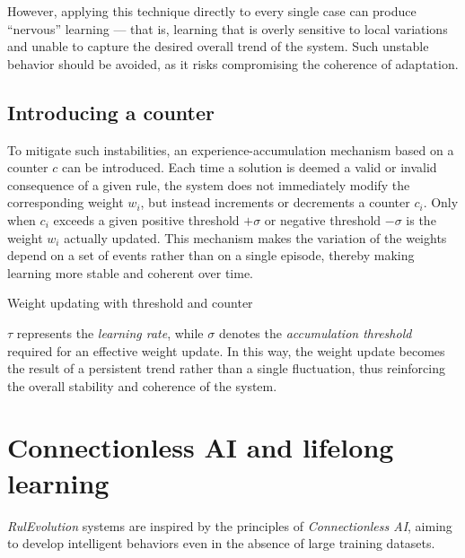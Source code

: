 \documentclass[12pt,a4paper]{article}
\begin{document}
However, applying this technique directly to every single case can produce “nervous” learning — that is, learning that is overly sensitive to local variations and unable to capture the desired overall trend of the system.  
Such unstable behavior should be avoided, as it risks compromising the coherence of adaptation.

\subsection{Introducing a counter}  
To mitigate such instabilities, an experience-accumulation mechanism based on a counter $c$ can be introduced.  
Each time a solution is deemed a valid or invalid consequence of a given rule, the system does not immediately modify the corresponding weight $w_i$, but instead increments or decrements a counter $c_i$.  
Only when $c_i$ exceeds a given positive threshold $+\sigma$ or negative threshold $-\sigma$ is the weight $w_i$ actually updated.  
This mechanism makes the variation of the weights depend on a set of events rather than on a single episode, thereby making learning more stable and coherent over time.

\bigskip

\begin{algorithm}[H]
\caption{Weight updating with threshold and counter}

\medskip
{}
\bigskip

\end{algorithm}

\bigskip

$\tau$ represents the \textit{learning rate}, while $\sigma$ denotes the \textit{accumulation threshold} required for an effective weight update.  
In this way, the weight update becomes the result of a persistent trend rather than a single fluctuation, thus reinforcing the overall stability and coherence of the system.


\section{Connectionless AI and lifelong learning}
\textit{RulEvolution} systems are inspired by the principles of \textit{Connectionless AI}, aiming to develop intelligent behaviors even in the absence of large training datasets.
\end{document}
